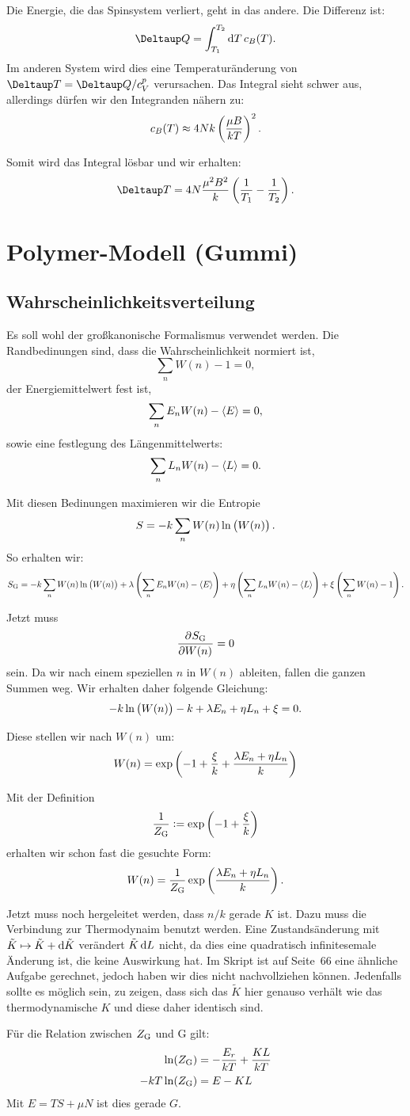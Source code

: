 Die Energie, die das Spinsystem verliert, geht in das andere. Die Differenz ist:
\[
    \Deltaup Q = \int_{T_1}^{T_2} \dif T \, c_B(T).
\]
Im anderen System wird dies eine Temperaturänderung von $\Deltaup T = \Deltaup Q / c_V^p$ verursachen. Das Integral sieht schwer aus, allerdings dürfen wir den Integranden nähern zu:
\[
    c_B(T) \approx 4 Nk \del{\frac{\mu B}{kT}}^2.
\]

Somit wird das Integral lösbar und wir erhalten:
\[
    \Deltaup T = 4 N \frac{\mu^2 B^2}{k} \del{\frac 1{T_1} - \frac 1{T_2}}.
\]

\section{Polymer-Modell (Gummi)}

\subsection{Wahrscheinlichkeitsverteilung}

Es soll wohl der großkanonische Formalismus verwendet werden. Die Randbedinungen sind, dass die Wahrscheinlichkeit normiert ist,
\[
    \sum_n W(n) - 1 = 0,
\]
der Energiemittelwert fest ist,
\[
    \sum_n E_n W(n) - \left\langle E\right\rangle = 0,
\]
sowie eine festlegung des Längenmittelwerts:
\[
    \sum_n L_n W(n) - \left\langle L\right\rangle = 0.
\]

Mit diesen Bedinungen maximieren wir die Entropie
\[
    S = - k \sum_n W(n) \ln\del{W(n)}.
\]
So erhalten wir:
\[
    S_\text G = - k \sum_n W(n) \ln\del{W(n)}
    + \lambda \del{\sum_n E_n W(n) - \mw E}
    + \eta \del{\sum_n L_n W(n) - \mw L}
    + \xi \del{\sum_n W(n) - 1}.
\]

Jetzt muss
\[
    \dpd{S_\text G}{W(n)} = 0
\]
sein. Da wir nach einem speziellen $n$ in $W(n)$ ableiten, fallen die ganzen Summen weg. Wir erhalten daher folgende Gleichung:
\[
    - k \ln\del{W(n)} - k + \lambda E_n + \eta L_n + \xi = 0.
\]

Diese stellen wir nach $W(n)$ um:
\[
    W(n) = \exp\del{-1 + \frac \xi k + \frac{\lambda E_n + \eta L_n}{k}}
\]

Mit der Definition
\[
    \frac 1{Z_\text G} := \exp\del{-1 + \frac \xi k}
\]
erhalten wir schon fast die gesuchte Form:
\[
    W(n) = \frac 1{Z_\text G} \exp\del{\frac{\lambda E_n + \eta L_n}{k}}.
\]

Jetzt muss noch hergeleitet werden, dass $n/k$ gerade $K$ ist. Dazu muss die
Verbindung zur Thermodynaim benutzt werden. Eine Zustandsänderung mit $\tilde K
\mapsto \tilde K + \dif \tilde K$ verändert $\tilde K \dif L$ nicht, da dies
eine quadratisch infinitesemale Änderung ist, die keine Auswirkung hat. Im
Skript ist auf Seite~66 eine ähnliche Aufgabe gerechnet, jedoch haben wir dies
nicht nachvollziehen können. Jedenfalls sollte es möglich sein, zu zeigen, dass
sich das $\tilde K$ hier genauso verhält wie das thermodynamische $K$ und diese
daher identisch sind.

Für die Relation zwischen $Z_\text G$ und G gilt:
\begin{align*}
    \ln(Z_\text G) &= - \frac{E_r}{kT} + \frac{KL}{kT} \\
    - kT \ln(Z_\text G) &= E - KL
\end{align*}
Mit $E = TS + \mu N$ ist dies gerade $G$.



